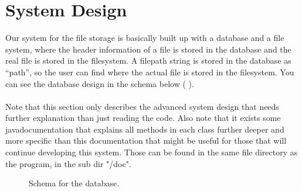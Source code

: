 \section{System Design}

Our system for the file storage is basically built up with a database and a file system, where the header information of a file is stored in the database and the real file is stored in the filesystem. A filepath string is stored in the database as “path”, so the user can find where the actual file is stored in the filesystem. You can see the database design in the schema below ( ). \\
\\
Note that this section only describes the advanced system design that needs further explanation than just reading the code. Also note that it exists some javadocumentation that explains all methods in each class further deeper and more specific than this documentation that might be useful for those that will continue developing this system. Those can be found in the same file directory as the program, in the sub dir "/doc".

\begin{figure}[htb]
\caption{Schema for the database.}
\label{fig:dat_databaseSchema}
\end{figure}

\FloatBarrier

